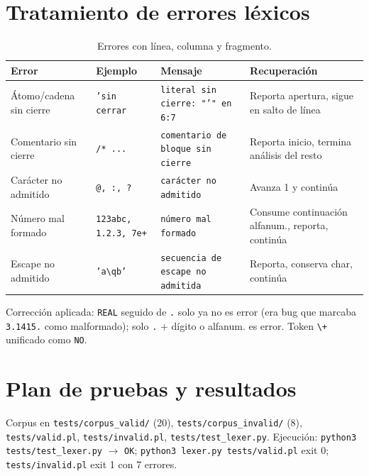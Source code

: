 \documentclass[12pt,a4paper]{article}
\begin{document}
\section{Tratamiento de errores léxicos}
\begin{table}[H]
\centering
{\small\setlength{\tabcolsep}{3pt}
\begin{tabular}{|p{3cm}|p{3.5cm}|p{4cm}|p{4cm}|}
\hline
\textbf{Error} & \textbf{Ejemplo} & \textbf{Mensaje} & \textbf{Recuperación} \\ \hline
Átomo/cadena sin cierre & \texttt{'sin cerrar} & \texttt{literal sin cierre: "'" en 6:7} & Reporta apertura, sigue en salto de línea \\ \hline
Comentario sin cierre & \texttt{/* ...} & \texttt{comentario de bloque sin cierre} & Reporta inicio, termina análisis del resto \\ \hline
Carácter no admitido & \texttt{@, :, ?} & \texttt{carácter no admitido} & Avanza 1 y continúa \\ \hline
Número mal formado & \texttt{123abc, 1.2.3, 7e+} & \texttt{número mal formado} & Consume continuación alfanum., reporta, continúa \\ \hline
Escape no admitido & \texttt{'a\textbackslash qb'} & \texttt{secuencia de escape no admitida} & Reporta, conserva char, continúa \\ \hline
\end{tabular}
}
\caption{Errores con línea, columna y fragmento.}
\end{table}
Corrección aplicada: \texttt{REAL} seguido de \texttt{.} solo ya no es error (era bug que marcaba \texttt{3.1415.} como malformado); solo \texttt{.} + dígito o alfanum. es error. Token \texttt{\textbackslash+} unificado como \texttt{NO}.

\section{Plan de pruebas y resultados}
Corpus en \texttt{tests/corpus\_valid/} (20), \texttt{tests/corpus\_invalid/} (8), \texttt{tests/valid.pl}, \texttt{tests/invalid.pl}, \texttt{tests/test\_lexer.py}. Ejecución: \texttt{python3 tests/test\_lexer.py} $\rightarrow$ \texttt{OK}; \texttt{python3 lexer.py tests/valid.pl} exit 0; \texttt{tests/invalid.pl} exit 1 con 7 errores.
\end{document}
